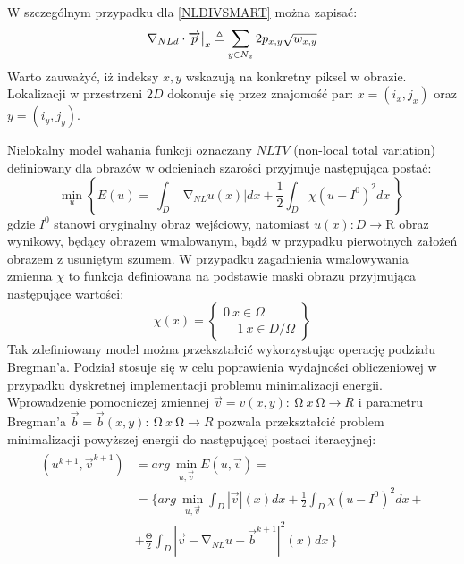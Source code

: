 \documentclass[12pt, twoside, openany]{report}
\theoremstyle{definition}
\begin{document}
W szczególnym przypadku dla \eqref{NLDIVSMART} można zapisać:
\begin{equation}
{\mathrm{\nabla }}_{NLd}\cdot \overrightarrow{p}\big|_x \triangleq \sum_{ 
y\in N_x \\ 
}{2p_{x,y}}\sqrt{w_{x,y}}
\label{DNLDIVSMART}
\end{equation}
Warto zauważyć, iż indeksy $x,y$ wskazują na konkretny piksel w obrazie. Lokalizacji w przestrzeni $2D$ dokonuje się przez znajomość par: $x=(i_x,j_x)$ oraz $y=(i_y,j_y)$.
\par 
Nielokalny model wahania funkcji oznaczany $NLTV$ (non-local total variation) definiowany dla obrazów w odcieniach szarości przyjmuje następująca postać:
\begin{equation}
{\mathop{\mathrm{min}}_{u} \left\{E\left(u\right)=\ \int_D{\left|{\mathrm{\nabla }}_{NL}u(x)\right|}dx+\frac{1}{2}\int_D{\chi{\left(u-I^0\right)}^2}dx\ \right\}\ }
\label{NLTVGRAY}
\end{equation}
gdzie $I^0$ stanowi oryginalny obraz wejściowy, natomiast $u\left(x\right):D\mathrm{\longrightarrow }\mathrm{R}$ obraz wynikowy, będący obrazem wmalowanym, bądź w przypadku pierwotnych założeń obrazem z usuniętym szumem. W przypadku zagadnienia wmalowywania zmienna ${\chi }$ to funkcja definiowana na podstawie maski obrazu przyjmująca następujące wartości:
\begin{equation}
\chi \left(x\right)=\left\{ \begin{array}{c}
0\ x \in \Omega \\ 
\ \ \ \ \ 1\ x \in D/ \Omega \end{array}
\right\}
\label{maskFunction}
\end{equation}
Tak zdefiniowany model można przekształcić wykorzystując operację podziału Bregman’a. Podział stosuje się w celu poprawienia wydajności obliczeniowej w przypadku dyskretnej implementacji problemu minimalizacji energii. Wprowadzenie pomocniczej zmiennej $\overrightarrow{v}=v\left(x,y\right):\ \mathrm{\Omega }\mathrm{\ }x\ \mathrm{\Omega }\longrightarrow R$ i parametru Bregman’a $\overrightarrow{b}=\overrightarrow{b}\left(x,y\right):\ \mathrm{\Omega }\mathrm{\ }x\ \mathrm{\Omega }\longrightarrow R$ pozwala przekształcić problem minimalizacji powyższej energii do następującej postaci iteracyjnej:
\begin{align}
\begin{aligned}
\left(u^{k+1},{\overrightarrow{v}}^{k+1}\right) &= arg\ \mathop{\mathrm{min}}_{u,\overrightarrow{v}} E\left(u,\overrightarrow{v}\right)=\\ 
&= \biggl\{arg\ \mathop{\mathrm{min}}_{u,\overrightarrow{v}}
\int_D{|\overrightarrow{v}|\left(x\right)}dx+\frac{1}{2}\int_D{{\chi }{\left(u-I^0\right)}^2}dx+\\
&+  \frac{\mathrm{\Theta }}{2}\int_D{{\left|\overrightarrow{v}-{\mathrm{\nabla }}_{NL}u-{\overrightarrow{b}}^{k+1}\right|}^2(x)}dx\ \biggr\}
\end{aligned}
\label{NLTVGRAYMINPROB}
\end{align}
\end{document}
